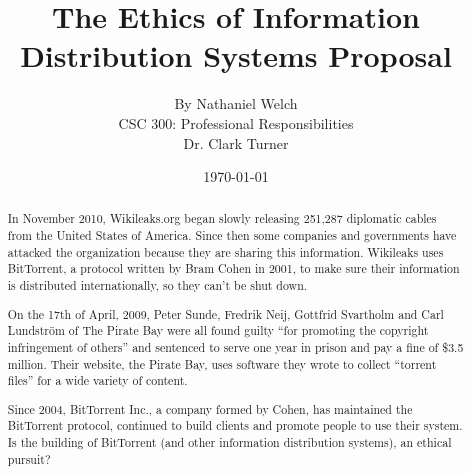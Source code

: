 \documentclass[11pt]{article}
\begin{document}
\title{\vfill The Ethics of Information Distribution Systems Proposal} %
\author{
By Nathaniel Welch\vspace{10pt}\\
CSC 300: Professional Responsibilities\vspace{10pt}\\
Dr. Clark Turner\vspace{10pt}\\
}
\date{\today}

\maketitle

\vfill %
\begin{abstract}

In November 2010, Wikileaks.org began slowly releasing 251,287 diplomatic cables from the United States of America. \cite{cablegate} Since then some companies and governments have attacked the organization because they are sharing this information. Wikileaks uses BitTorrent, a protocol written by Bram Cohen in 2001, to make sure their information is distributed internationally, so they can't be shut down.

On the 17th of April, 2009, Peter Sunde, Fredrik Neij, Gottfrid Svartholm and Carl Lundström of The Pirate Bay were all found guilty ``for promoting the copyright infringement of others'' and sentenced to serve one year in prison and pay a fine of \$3.5 million. \cite{tpbverdict} Their website, the Pirate Bay, uses software they wrote to collect ``torrent files'' for a wide variety of content.

Since 2004, BitTorrent Inc., a company formed by Cohen, has maintained the BitTorrent protocol, continued to build clients and promote people to use their system. Is the building of BitTorrent (and other information distribution systems), an ethical pursuit?

\end{abstract}

\thispagestyle{empty} %
\newpage
\end{document}
